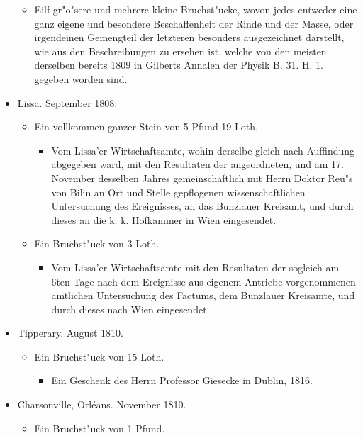 \documentclass[a4paper, 11pt, oneside, polutonikogreek, german]{article}
\begin{document}
\begin{itemize}
\begin{itemize}
        \item Eilf gr"o"sere und mehrere kleine Bruchst"ucke, wovon jedes entweder eine ganz eigene und besondere Beschaffenheit der Rinde und der Masse, oder irgendeinen Gemengteil der letzteren besonders ausgezeichnet darstellt, wie aus den Beschreibungen zu ersehen ist, welche von den meisten derselben bereits 1809 in Gilberts Annalen der Physik B. 31. H. 1. gegeben worden sind.
    \end{itemize}
    \item Lissa. September 1808.
    \begin{itemize}
        \item Ein vollkommen ganzer Stein von 5 Pfund 19 Loth.
        \begin{itemize}
            \item Vom Lissa'er Wirtschaftsamte, wohin derselbe gleich nach Auffindung abgegeben ward, mit den Resultaten der angeordneten, und am 17. November desselben Jahres gemeinschaftlich mit Herrn Doktor Reu"s von Bilin an Ort und Stelle gepflogenen wissenschaftlichen Untersuchung des Ereignisses, an das Bunzlauer Kreisamt, und durch dieses an die k. k. Hofkammer in Wien eingesendet.
        \end{itemize}
        \item Ein Bruchst"uck von 3 Loth.
        \begin{itemize}
            \item Vom Lissa'er Wirtschaftsamte mit den Resultaten der sogleich am 6ten Tage nach dem Ereignisse aus eigenem Antriebe vorgenommenen amtlichen Untersuchung des Factums, dem Bunzlauer Kreisamte, und durch dieses nach Wien eingesendet.
        \end{itemize}
    \end{itemize}
    \item Tipperary. August 1810.
    \begin{itemize}
        \item Ein Bruchst"uck von 15 Loth.
        \begin{itemize}
            \item Ein Geschenk des Herrn Professor Giesecke in Dublin, 1816.
        \end{itemize}
    \end{itemize}
    \item Charsonville, Orléans. November 1810.
    \begin{itemize}
        \item Ein Bruchst"uck von 1 Pfund.
        \begin{itemize}

\end{itemize}
\end{itemize}
\end{itemize}
\end{document}
